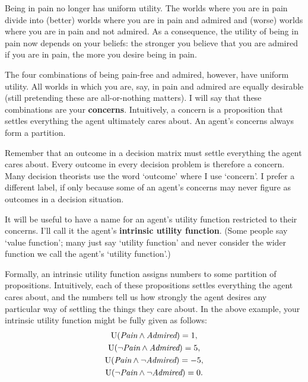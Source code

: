 Being in pain no longer has uniform utility. The worlds where you are in pain
divide into (better) worlds where you are in pain and admired and (worse) worlds
where you are in pain and not admired. As a consequence, the utility of being in
pain now depends on your beliefs: the stronger you believe that you are admired
if you are in pain, the more you desire being in pain.

The four combinations of being pain-free and admired, however, have uniform
utility. All worlds in which you are, say, in pain and admired are equally
desirable (still pretending these are all-or-nothing matters). I will say that
these combinations are your \textbf{concerns}. Intuitively, a concern is a
proposition that settles everything the agent ultimately cares about. An agent's
concerns always form a partition.

Remember that an outcome in a decision matrix must settle everything the agent
cares about. Every outcome in every decision problem is therefore a concern.
Many decision theorists use the word `outcome' where I use `concern'. I prefer a
different label, if only because some of an agent's concerns may never figure as
outcomes in a decision situation.

It will be useful to have a name for an agent's utility function restricted to
their concerns. I'll call it the agent's \textbf{intrinsic utility function}.
(Some people say `value function'; many just say `utility function' and never
consider the wider function we call the agent's `utility function'.)

Formally, an intrinsic utility function assigns numbers to some partition of
propositions. Intuitively, each of these propositions settles everything the
agent cares about, and the numbers tell us how strongly the agent desires any
particular way of settling the things they care about. In the above example,
your intrinsic utility function might be fully given as follows:
\begin{gather*}
  \text{U}(\emph{Pain} \land \emph{Admired}) = 1,\\
  \text{U}(\neg\emph{Pain} \land \emph{Admired}) = 5,\\
  \text{U}(\emph{Pain} \land \neg \emph{Admired}) = -5,\\
  \text{U}(\neg \emph{Pain} \land \neg \emph{Admired}) = 0.
\end{gather*}

